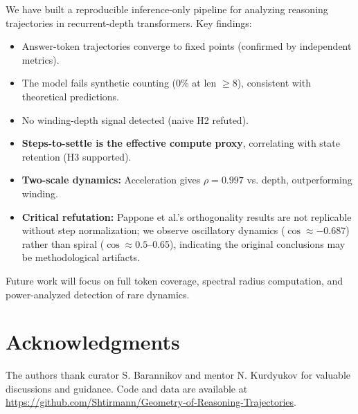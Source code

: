 \documentclass[12pt,a4paper]{article}
\begin{document}
We have built a reproducible inference-only pipeline for analyzing reasoning trajectories in recurrent-depth transformers. Key findings:

\begin{itemize}
    \item Answer-token trajectories converge to fixed points (confirmed by independent metrics).
    \item The model fails synthetic counting (0\% at len $\geq 8$), consistent with theoretical predictions.
    \item No winding-depth signal detected (naive H2 refuted).
    \item \textbf{Steps-to-settle is the effective compute proxy}, correlating with state retention (H3 supported).
    \item \textbf{Two-scale dynamics:} Acceleration gives $\rho = 0.997$ vs. depth, outperforming winding.
    \item \textbf{Critical refutation:} Pappone et al.'s orthogonality results are not replicable without step normalization; we observe oscillatory dynamics ($\cos \approx -0.687$) rather than spiral ($\cos \approx 0.5$--0.65), indicating the original conclusions may be methodological artifacts.
\end{itemize}

Future work will focus on full token coverage, spectral radius computation, and power-analyzed detection of rare dynamics.

\section*{Acknowledgments}
The authors thank curator S. Barannikov and mentor N. Kurdyukov for valuable discussions and guidance. Code and data are available at \url{https://github.com/Shtirmann/Geometry-of-Reasoning-Trajectories}.
\end{document}
